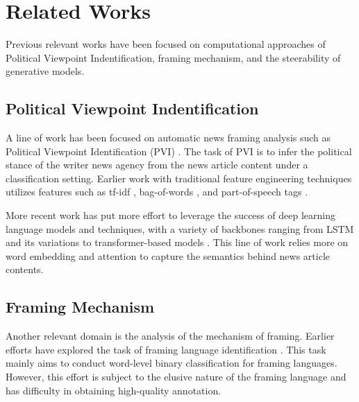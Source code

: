 \chapter{Related Works}

Previous relevant works have been focused on computational approaches of Political Viewpoint Indentification, framing mechanism, and the steerability of generative models.

\section{Political Viewpoint Indentification}
A line of work has been focused on automatic news framing analysis such as Political Viewpoint Identification (PVI) \cite{PVI-survey,li-goldwasser-2021-using,kim-johnson-2022-close,matero-etal-2021-melt-message,li-caragea-2021-multi,yu2008classify,hoyland-etal-2014-predicting,biessmann2016pvi,duthie2016mining,baly-etal-2019-multi,li2017pvi-lstm,rao2016pvi-lstm,gangula-etal-2019-detecting,kummervold-etal-2021-operationalizing,baly-etal-2020-detect,luo-etal-2020-detecting}. The task of PVI is to infer the political stance of the writer news agency from the news article content under a classification setting. Earlier work with traditional feature engineering techniques utilizes features such as tf-idf \cite{yu2008classify}, bag-of-words \cite{yu2008classify,hoyland-etal-2014-predicting,biessmann2016pvi}, and part-of-speech tags \cite{hoyland-etal-2014-predicting,duthie2016mining,baly-etal-2019-multi}.

More recent work has put more effort to leverage the success of deep learning language models and techniques, with a variety of backbones ranging from LSTM and its variations \cite{li2017pvi-lstm,rao2016pvi-lstm,gangula-etal-2019-detecting} to transformer-based models \cite{kummervold-etal-2021-operationalizing,baly-etal-2020-detect,luo-etal-2020-detecting}. This line of work relies more on word embedding and attention to capture the semantics behind news article contents.


\section{Framing Mechanism}
Another relevant domain is the analysis of the mechanism of framing. Earlier efforts have explored the task of framing language identification \cite{hamborg2020media,drakulich2015explicit,sap2019social,baumer-etal-2015-testing}. This task mainly aims to conduct word-level binary classification for framing languages. However, this effort is subject to the elusive nature of the framing language and has difficulty in obtaining high-quality annotation.


